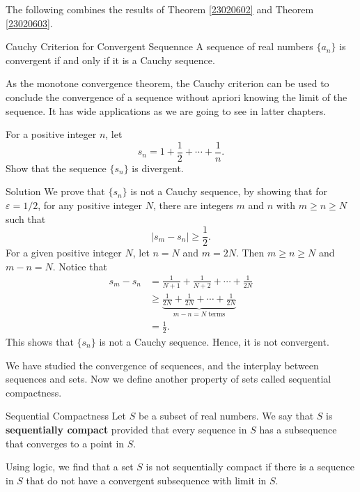 The following combines the results of Theorem \ref{23020602} and Theorem \ref{23020603}.
\begin{highlight}{Cauchy Criterion for Convergent Sequennce}
A sequence of real numbers $\{a_n\}$ is convergent if and only if it is a Cauchy sequence.
\end{highlight}

As the monotone convergence theorem, the Cauchy criterion can be used to conclude the convergence of a sequence without apriori knowing the limit of the sequence. It has wide applications as we are going to see in latter chapters. 
\begin{example}
{}For a positive integer $n$, let
\[s_n=1+\frac{1}{2}+\cdots+\frac{1}{n}.\]
Show that the sequence $\{s_n\}$ is divergent.

\end{example}
\begin{solution}{Solution}
We prove that $\{s_n\}$ is not a Cauchy sequence, by showing that for $\varepsilon=1/2$, for any positive integer $N$, there are integers $m$ and $n$ with $m\geq n\geq N$ such that 
\[|s_m-s_n|\geq \frac{1}{2}.\]
For a given positive integer $N$, let $n=N$ and $m=2N$. Then $m\geq n\geq N$ and $m-n=N$.   Notice that
\begin{align*}s_m-s_n&=\frac{1}{N+1}+\frac{1}{N+2}+\cdots+\frac{1}{2N}\\& \geq \underbrace{\frac{1}{2N}+\frac{1}{2N}+\cdots+\frac{1}{2N}}_{m-n=N\;\text{terms}}\\&=\frac{1}{2}.\end{align*}This shows that $\{s_n\}$ is not a Cauchy sequence. Hence, it is not convergent.
\end{solution}

We have studied the convergence   of sequences, and the interplay between sequences and sets.
Now we define another property of sets called sequential compactness.
 \begin{definition}{Sequential Compactness}
 Let $S$ be a subset of real numbers. We say that $S$ is {\bf sequentially compact}  provided that   every sequence in $S$ has a subsequence that converges to a point in $S$.
 \end{definition}
 Using logic, we find that a set $S$ is not sequentially compact if there is a sequence in $S$ that do not have a convergent subsequence with limit in $S$.
 
